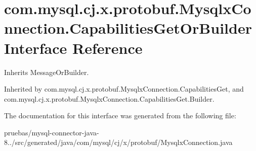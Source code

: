 \hypertarget{interfacecom_1_1mysql_1_1cj_1_1x_1_1protobuf_1_1_mysqlx_connection_1_1_capabilities_get_or_builder}{}\section{com.\+mysql.\+cj.\+x.\+protobuf.\+Mysqlx\+Connection.\+Capabilities\+Get\+Or\+Builder Interface Reference}
\label{interfacecom_1_1mysql_1_1cj_1_1x_1_1protobuf_1_1_mysqlx_connection_1_1_capabilities_get_or_builder}


Inherits Message\+Or\+Builder.



Inherited by com.\+mysql.\+cj.\+x.\+protobuf.\+Mysqlx\+Connection.\+Capabilities\+Get, and com.\+mysql.\+cj.\+x.\+protobuf.\+Mysqlx\+Connection.\+Capabilities\+Get.\+Builder.



The documentation for this interface was generated from the following file\+:\begin{DoxyCompactItemize}
\item 
pruebas/mysql-\/connector-\/java-\/8../src/generated/java/com/mysql/cj/x/protobuf/Mysqlx\+Connection.\+java\end{DoxyCompactItemize}
